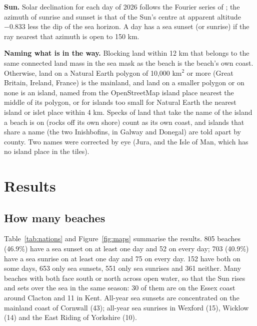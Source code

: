 \documentclass[11pt,a4paper]{article}
\begin{document}
\textbf{Sun.} Solar declination for each day of 2026 follows the Fourier series of \citet{spencer1971}; the azimuth of sunrise and sunset is that of the Sun's centre at apparent altitude $-0.833$\textdegree{} less the dip of the sea horizon. A day has a sea sunset (or sunrise) if the ray nearest that azimuth is open to 150 km.

\textbf{Naming what is in the way.} Blocking land within 12 km that belongs to the same connected land mass in the sea mask as the beach is the beach's own coast. Otherwise, land on a Natural Earth polygon of 10,000 km$^2$ or more (Great Britain, Ireland, France) is the mainland, and land on a smaller polygon or on none is an island, named from the OpenStreetMap island place nearest the middle of its polygon, or for islands too small for Natural Earth the nearest island or islet place within 4 km. Specks of land that take the name of the island a beach is on (rocks off its own shore) count as its own coast, and islands that share a name (the two Inishbofins, in Galway and Donegal) are told apart by county. Two names were corrected by eye (Jura, and the Isle of Man, which has no island place in the tiles).

\section{Results}
\subsection{How many beaches}
Table~\ref{tab:nations} and Figure~\ref{fig:maps} summarise the results. 805 beaches (46.9\%) have a sea sunset on at least one day and 52 on every day; 703 (40.9\%) have a sea sunrise on at least one day and 75 on every day. 152 have both on some days, 653 only sea sunsets, 551 only sea sunrises and 361 neither. Many beaches with both face south or north across open water, so that the Sun rises and sets over the sea in the same season: 30 of them are on the Essex coast around Clacton and 11 in Kent. All-year sea sunsets are concentrated on the mainland coast of Cornwall (43); all-year sea sunrises in Wexford (15), Wicklow (14) and the East Riding of Yorkshire (10).
\end{document}
